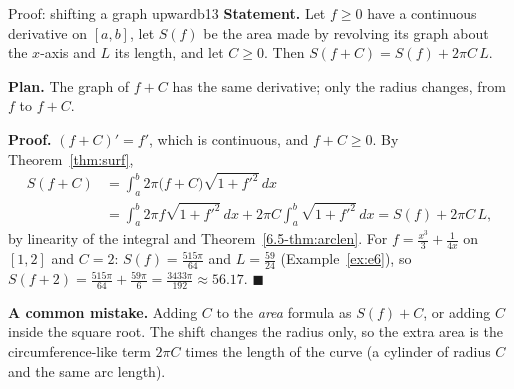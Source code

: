 \documentclass[11pt]{article}
\begin{document}
\begin{exmp}{Proof: shifting a graph upward}{b13}
\textbf{Statement.} Let $f\ge0$ have a continuous derivative on $[a,b]$, let $S(f)$ be the area made by revolving its graph about the $x$-axis and $L$ its length, and let $C\ge0$. Then $S(f+C)=S(f)+2\pi C\,L$.

\textbf{Plan.} The graph of $f+C$ has the same derivative; only the radius changes, from $f$ to $f+C$.

\textbf{Proof.} $(f+C)'=f'$, which is continuous, and $f+C\ge0$. By Theorem~\ref{thm:surf},
\[
\begin{aligned}
S(f+C)&=\int_a^b2\pi\bigl(f+C\bigr)\sqrt{1+f'^2}\,dx\\
&=\int_a^b2\pi f\sqrt{1+f'^2}\,dx+2\pi C\int_a^b\sqrt{1+f'^2}\,dx=S(f)+2\pi C\,L,
\end{aligned}
\]
by linearity of the integral and Theorem~\ref{6.5-thm:arclen}. For $f=\frac{x^3}3+\frac1{4x}$ on $[1,2]$ and $C=2$: $S(f)=\frac{515\pi}{64}$ and $L=\frac{59}{24}$ (Example~\ref{ex:e6}), so $S(f+2)=\frac{515\pi}{64}+\frac{59\pi}6=\frac{3433\pi}{192}\approx56.17$. $\blacksquare$

\textbf{A common mistake.} Adding $C$ to the \emph{area} formula as $S(f)+C$, or adding $C$ inside the square root. The shift changes the radius only, so the extra area is the circumference-like term $2\pi C$ times the length of the curve (a cylinder of radius $C$ and the same arc length).
\end{exmp}
\end{document}
